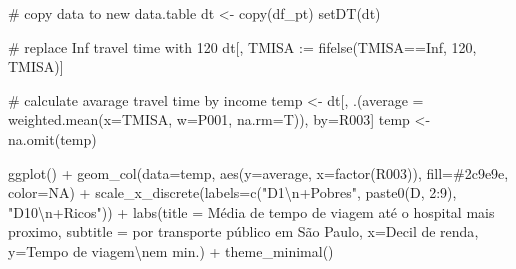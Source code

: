 \documentclass[
  letterpaper,
  DIV=11,
  numbers=noendperiod]{scrreprt}
\newenvironment{Shaded}{\begin{snugshade}}{\end{snugshade}}
\newcommand{\AttributeTok}[1]{\textcolor[rgb]{0.40,0.45,0.13}{#1}}
\newcommand{\CommentTok}[1]{\textcolor[rgb]{0.37,0.37,0.37}{#1}}
\newcommand{\ConstantTok}[1]{\textcolor[rgb]{0.56,0.35,0.01}{#1}}
\newcommand{\DecValTok}[1]{\textcolor[rgb]{0.68,0.00,0.00}{#1}}
\newcommand{\ErrorTok}[1]{\textcolor[rgb]{0.68,0.00,0.00}{#1}}
\newcommand{\FunctionTok}[1]{\textcolor[rgb]{0.28,0.35,0.67}{#1}}
\newcommand{\NormalTok}[1]{\textcolor[rgb]{0.00,0.23,0.31}{#1}}
\newcommand{\OtherTok}[1]{\textcolor[rgb]{0.00,0.23,0.31}{#1}}
\newcommand{\SpecialCharTok}[1]{\textcolor[rgb]{0.37,0.37,0.37}{#1}}
\newcommand{\StringTok}[1]{\textcolor[rgb]{0.13,0.47,0.30}{#1}}
\begin{document}
\begin{Shaded}
\begin{Highlighting}[]
\CommentTok{\# copy data to new data.table}
\NormalTok{dt }\OtherTok{\textless{}{-}} \FunctionTok{copy}\NormalTok{(df\_pt)}
\FunctionTok{setDT}\NormalTok{(dt)}

\CommentTok{\# replace Inf travel time with 120}
\NormalTok{dt[, TMISA }\SpecialCharTok{:}\ErrorTok{=} \FunctionTok{fifelse}\NormalTok{(TMISA}\SpecialCharTok{==}\ConstantTok{Inf}\NormalTok{, }\DecValTok{120}\NormalTok{, TMISA)]}

\CommentTok{\# calculate avarage travel time by income}
\NormalTok{temp }\OtherTok{\textless{}{-}}\NormalTok{ dt[, .(}\AttributeTok{average =} \FunctionTok{weighted.mean}\NormalTok{(}\AttributeTok{x=}\NormalTok{TMISA, }\AttributeTok{w=}\NormalTok{P001, }\AttributeTok{na.rm=}\NormalTok{T)), by}\OtherTok{=}\NormalTok{R003]}
\NormalTok{temp }\OtherTok{\textless{}{-}} \FunctionTok{na.omit}\NormalTok{(temp)}

\FunctionTok{ggplot}\NormalTok{() }\SpecialCharTok{+} 
  \FunctionTok{geom\_col}\NormalTok{(}\AttributeTok{data=}\NormalTok{temp, }\FunctionTok{aes}\NormalTok{(}\AttributeTok{y=}\NormalTok{average, }\AttributeTok{x=}\FunctionTok{factor}\NormalTok{(R003)), }\AttributeTok{fill=}\StringTok{\textquotesingle{}\#2c9e9e\textquotesingle{}}\NormalTok{, }\AttributeTok{color=}\ConstantTok{NA}\NormalTok{) }\SpecialCharTok{+}
  \FunctionTok{scale\_x\_discrete}\NormalTok{(}\AttributeTok{labels=}\FunctionTok{c}\NormalTok{(}\StringTok{"D1}\SpecialCharTok{\textbackslash{}n}\StringTok{+Pobres"}\NormalTok{, }\FunctionTok{paste0}\NormalTok{(}\StringTok{\textquotesingle{}D\textquotesingle{}}\NormalTok{, }\DecValTok{2}\SpecialCharTok{:}\DecValTok{9}\NormalTok{), }\StringTok{"D10}\SpecialCharTok{\textbackslash{}n}\StringTok{+Ricos"}\NormalTok{)) }\SpecialCharTok{+}
  \FunctionTok{labs}\NormalTok{(}\AttributeTok{title =} \StringTok{\textquotesingle{}Média de tempo de viagem até o hospital mais proximo\textquotesingle{}}\NormalTok{,}
       \AttributeTok{subtitle =} \StringTok{\textquotesingle{}por transporte público em São Paulo\textquotesingle{}}\NormalTok{,}
       \AttributeTok{x=}\StringTok{\textquotesingle{}Decil de renda\textquotesingle{}}\NormalTok{, }\AttributeTok{y=}\StringTok{\textquotesingle{}Tempo de viagem}\SpecialCharTok{\textbackslash{}n}\StringTok{em min.\textquotesingle{}}\NormalTok{) }\SpecialCharTok{+}
  \FunctionTok{theme\_minimal}\NormalTok{()}
\end{Highlighting}
\end{Shaded}
\end{document}
